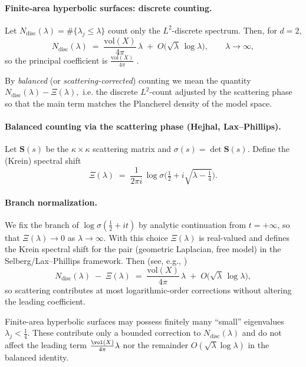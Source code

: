 \paragraph{Finite-area hyperbolic surfaces: discrete counting.}
Let $N_{\mathrm{disc}}(\lambda)=\#\{\lambda_j\le\lambda\}$ count only the $L^2$-discrete spectrum.
Then, for $d=2$,
\[
  N_{\mathrm{disc}}(\lambda)
  \;=\; \frac{\mathrm{vol}(X)}{4\pi}\,\lambda \;+\; O\!\big(\sqrt{\lambda}\,\log\lambda\big),
  \qquad \lambda\to\infty,
\]
so the principal coefficient is $\frac{\mathrm{vol}(X)}{4\pi}$ \cite{Selberg1956,Hejhal1983,Hejhal1983II}.

\begin{definition}
By \emph{balanced} (or \emph{scattering-corrected}) counting we mean the quantity
\(
  N_{\mathrm{disc}}(\lambda)-\Xi(\lambda),
\)
i.e. the discrete $L^2$-count adjusted by the scattering phase so that the main term matches the Plancherel density of the model space.
\end{definition}

\paragraph{Balanced counting via the scattering phase (Hejhal, Lax--Phillips).}
Let $\mathbf{S}(s)$ be the $\kappa\times\kappa$ scattering matrix and $\sigma(s)=\det\mathbf{S}(s)$.
Define the (Krein) spectral shift
\[
  \Xi(\lambda) \;=\; \frac{1}{2\pi i}\,\log \sigma\!\Big(\tfrac12 + i\sqrt{\lambda - \tfrac14}\Big).
\]
\paragraph{Branch normalization.}
We fix the branch of $\log\sigma(\tfrac12+it)$ by analytic continuation from $t=+\infty$, so that
$\Xi(\lambda)\to 0$ as $\lambda\to\infty$. With this choice $\Xi(\lambda)$ is real-valued and defines the Krein spectral shift for the pair (geometric Laplacian, free model) in the Selberg/Lax--Phillips framework.
Then (see, e.g., \cite{Hejhal1983,Hejhal1983II,LaxPhillips1976})
\[
  N_{\mathrm{disc}}(\lambda) \;-\; \Xi(\lambda)
  \;=\; \frac{\mathrm{vol}(X)}{4\pi}\,\lambda \;+\; O\!\big(\sqrt{\lambda}\,\log\lambda\big),
\]
so scattering contributes at most logarithmic-order corrections without altering the leading coefficient.

\begin{remark}
Finite-area hyperbolic surfaces may possess finitely many ``small'' eigenvalues $\lambda_j<\tfrac14$.
These contribute only a bounded correction to $N_{\mathrm{disc}}(\lambda)$ and do not affect the leading term
$\frac{\vol(X)}{4\pi}\lambda$ nor the remainder $O(\sqrt{\lambda}\log\lambda)$ in the balanced identity.
\end{remark}

